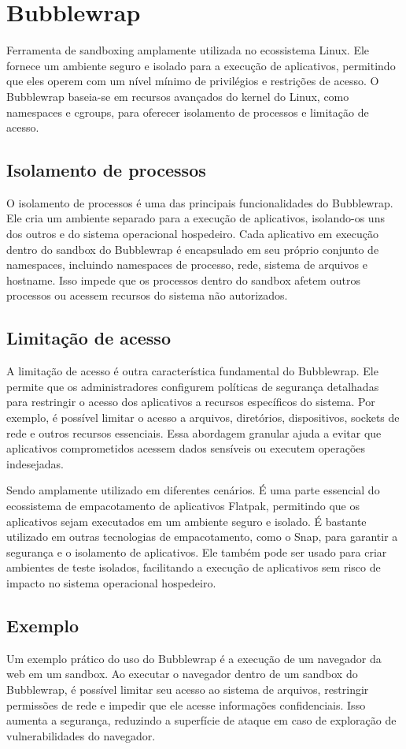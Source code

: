 \section{Bubblewrap}

 Ferramenta de sandboxing amplamente utilizada no ecossistema Linux. Ele fornece um ambiente seguro e isolado para a execução de aplicativos, permitindo que eles operem com um nível mínimo de privilégios e restrições de acesso. O Bubblewrap baseia-se em recursos avançados do kernel do Linux, como namespaces e cgroups, para oferecer isolamento de processos e limitação de acesso.

\subsection{Isolamento de processos}
O isolamento de processos é uma das principais funcionalidades do Bubblewrap. Ele cria um ambiente separado para a execução de aplicativos, isolando-os uns dos outros e do sistema operacional hospedeiro. Cada aplicativo em execução dentro do sandbox do Bubblewrap é encapsulado em seu próprio conjunto de namespaces, incluindo namespaces de processo, rede, sistema de arquivos e hostname. Isso impede que os processos dentro do sandbox afetem outros processos ou acessem recursos do sistema não autorizados.


\subsection{Limitação de acesso}
A limitação de acesso é outra característica fundamental do Bubblewrap. Ele permite que os administradores configurem políticas de segurança detalhadas para restringir o acesso dos aplicativos a recursos específicos do sistema. Por exemplo, é possível limitar o acesso a arquivos, diretórios, dispositivos, sockets de rede e outros recursos essenciais. Essa abordagem granular ajuda a evitar que aplicativos comprometidos acessem dados sensíveis ou executem operações indesejadas.

 Sendo amplamente utilizado em diferentes cenários. É uma parte essencial do ecossistema de empacotamento de aplicativos Flatpak, permitindo que os aplicativos sejam executados em um ambiente seguro e isolado. É bastante utilizado em outras tecnologias de empacotamento, como o Snap, para garantir a segurança e o isolamento de aplicativos. Ele também pode ser usado para criar ambientes de teste isolados, facilitando a execução de aplicativos sem risco de impacto no sistema operacional hospedeiro.

\subsection{Exemplo}

Um exemplo prático do uso do Bubblewrap é a execução de um navegador da web em um sandbox. Ao executar o navegador dentro de um sandbox do Bubblewrap, é possível limitar seu acesso ao sistema de arquivos, restringir permissões de rede e impedir que ele acesse informações confidenciais. Isso aumenta a segurança, reduzindo a superfície de ataque em caso de exploração de vulnerabilidades do navegador.